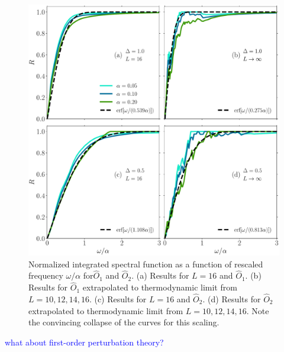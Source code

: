 \begin{figure}[ht]
  \centering
  \includegraphics[width=\figsize\textwidth]{Figures/O12_linear_scaling.pdf}
  \caption{Normalized integrated spectral function as a function of rescaled 
  frequency \(\omega/\alpha\) for\(\hat{O}_1\) and \(\hat{O}_2\).
  (a) Results for \(L=16\) and \(\hat{O}_1\).  (b) Results for \(\hat{O}_1\) extrapolated to
  thermodynamic limit from \(L=10,12,14,16\). (c) Results for \(L=16\) and \(\hat{O}_2\). 
  (d) Results for \(\hat{O}_2\) extrapolated to thermodynamic limit from \(L=10,12,14,16\).
  Note the convincing collapse of the curves for this scaling.}\label{fig:O12 linear scaling}
\end{figure}
\textcolor{blue}{what about first-order perturbation theory?}

